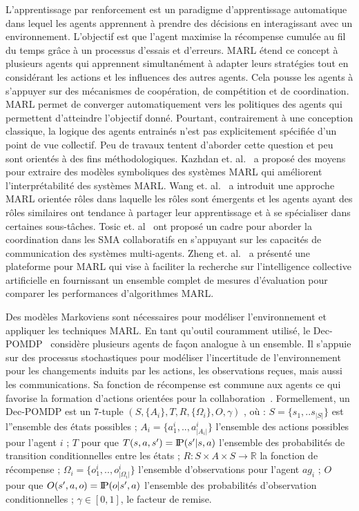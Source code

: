 \documentclass[contribution]{jfsma}
\newcommand{\probP}{\text{I\kern-0.15em P}}
\begin{document}
L'apprentissage par renforcement est un paradigme d'apprentissage automatique dans lequel les agents apprennent à prendre des décisions en interagissant avec un environnement. L’objectif est que l’agent maximise la récompense cumulée au fil du temps grâce à un processus d’essais et d’erreurs.
MARL étend ce concept à plusieurs agents qui apprennent simultanément à adapter leurs stratégies tout en considérant les actions et les influences des autres agents. Cela pousse les agents à s’appuyer sur des mécanismes de coopération, de compétition et de coordination.
MARL permet de converger automatiquement vers les politiques des agents qui permettent d'atteindre l'objectif donné. Pourtant, contrairement à une conception classique, la logique des agents entrainés n'est pas explicitement spécifiée d'un point de vue collectif. Peu de travaux tentent d’aborder cette question et peu sont orientés à des fins méthodologiques.
Kazhdan et. al.~\cite{Kazhdan2020} a proposé des moyens pour extraire des modèles symboliques des systèmes MARL qui améliorent l'interprétabilité des systèmes MARL.
Wang et. al.~\cite{Wang2020} a introduit une approche MARL orientée rôles dans laquelle les rôles sont émergents et les agents ayant des rôles similaires ont tendance à partager leur apprentissage et à se spécialiser dans certaines sous-tâches.
Tosic et. al~\cite{Tosic2010} ont proposé un cadre pour aborder la coordination dans les SMA collaboratifs en s'appuyant sur les capacités de communication des systèmes multi-agents.
Zheng et. al.~\cite{Zheng2018} a présenté une plateforme pour MARL qui vise à faciliter la recherche sur l'intelligence collective artificielle en fournissant un ensemble complet de mesures d'évaluation pour comparer les performances d'algorithmes MARL.

Des modèles Markoviens sont nécessaires pour modéliser l'environnement et appliquer les techniques MARL. En tant qu'outil couramment utilisé, le Dec-POMDP~\cite{Oliehoek2016} considère plusieurs agents de façon analogue à un ensemble. Il s'appuie sur des processus stochastiques pour modéliser l'incertitude de l'environnement pour les changements induits par les actions, les observations reçues, mais aussi les communications. Sa fonction de récompense est commune aux agents ce qui favorise la formation d'actions orientées pour la collaboration~\cite{Beynier2013}. Formellement, un Dec-POMDP est un 7-tuple $(S,\{A_i\},T,R,\{\Omega_i\},O,\gamma)$ , où : $S = \{s_1, .. s_{|S|}\}$ est l''ensemble des états possibles ; $A_{i} = \{a_{1}^{i},..,a_{|A_{i}|}^{i}\}$ l'ensemble des actions possibles pour l'agent $i$ ; $T$ pour que $T(s,a,s') = \probP{(s'|s,a)}$ l'ensemble des probabilités de transition conditionnelles entre les états ; $R : S \times A \times S \rightarrow \mathbb{R}$ la fonction de récompense ; $\Omega_{i} = \{o_{1}^{i},..,o_{|\Omega_{i}|}^{i}\}$  l'ensemble d'observations pour l'agent $ag_i$ ; $O$ pour que $O(s',a,o) = \probP{(o|s',a)}$  l'ensemble des probabilités d'observation conditionnelles ; $\gamma \in [0,1]$, le facteur de remise.
\end{document}
